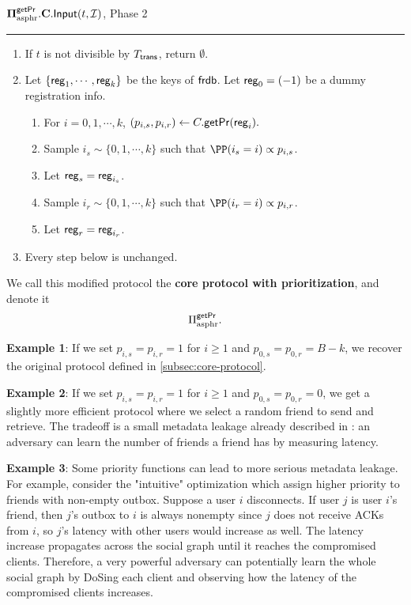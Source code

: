 \vspace{10pt}
$\mathbf{\Pi^{\mathsf{getPr}}_{\text{asphr}}.C.\mathsf{Input}}(t, \mathcal{I})$, Phase 2
\vspace{5pt}
\hrule

\begin{enumerate}
    \item If $t$ is not divisible by $T_{\mathsf{trans}}$, return $\emptyset$.
    \item Let $\{\mathsf{reg}_1, \cdots, \mathsf{reg}_k\}$ be the keys of $\mathsf{frdb}$. Let $\mathsf{reg}_0 = (-1)$ be a dummy registration info. 
    \begin{enumerate}
        \item For $i = 0,1,\cdots, k$, $(p_{i, s}, p_{i, r}) \leftarrow C.\mathsf{getPr}(\mathsf{reg}_i).$
        
        \item Sample $i_s \sim \{0, 1,\cdots, k\}$ such that $\PP(i_s = i) \propto p_{i, s}$. 
        \item Let $\mathsf{reg}_s = \mathsf{reg}_{i_s}$.
        \item Sample $i_r \sim \{0, 1,\cdots, k\}$ such that $\PP(i_r = i) \propto p_{i, r}$. 
        \item Let $\mathsf{reg}_r = \mathsf{reg}_{i_r}$.
    \end{enumerate}
    \item Every step below is unchanged.
\end{enumerate}
We call this modified protocol the \textbf{core protocol with prioritization}, and denote it
$$\Pi_{\text{asphr}}^{\mathsf{getPr}}.$$

\textbf{Example 1}: If we set $p_{i, s} = p_{i, r} = 1$ for $i \geq 1$ and $p_{0, s} = p_{0, r} = B - k$, we recover the original protocol defined in \cref{subsec:core-protocol}.

\textbf{Example 2}: If we set $p_{i, s} = p_{i, r} = 1$ for $i \geq 1$ and $p_{0, s} = p_{0, r} = 0$, we get a slightly more efficient protocol where we select a random friend to send and retrieve. The tradeoff is a small metadata leakage already described in \cite{angel2018cf}: an adversary can learn the number of friends a friend has by measuring latency.

\textbf{Example 3}: Some priority functions can lead to more serious metadata leakage. For example, consider the "intuitive" optimization which assign higher priority to friends with non-empty outbox. Suppose a user $i$ disconnects. If user $j$ is user $i$'s friend, then $j$'s outbox to $i$ is always nonempty since $j$ does not receive ACKs from $i$, so $j$'s latency with other users would increase as well. The latency increase propagates across the social graph until it reaches the compromised clients. Therefore, a very powerful adversary can potentially learn the whole social graph by DoSing each client and observing how the latency of the compromised clients increases.

